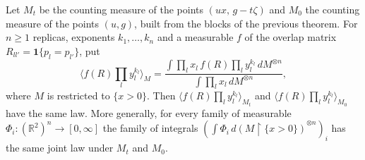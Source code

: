 \begin{theorem}\label{thm:sg:pd-lemma23}
  \leanok
Let $M_t$ be the counting measure of the points $(ux,\,g-t\zeta)$ and $M_0$ the counting measure of the points $(u,g)$, built from the blocks of the previous theorem. For $n\ge1$ replicas, exponents $k_1,\dots,k_n$ and a measurable $f$ of the overlap matrix $R_{ll'}=\mathbf 1\{p_l=p_{l'}\}$, put
\[\langle f(R)\textstyle\prod_l y_l^{k_l}\rangle_M=\frac{\int\prod_lx_l\,f(R)\prod_ly_l^{k_l}\,dM^{\otimes n}}{\int\prod_lx_l\,dM^{\otimes n}},\]
where $M$ is restricted to $\{x>0\}$. Then $\langle f(R)\prod_ly_l^{k_l}\rangle_{M_t}$ and $\langle f(R)\prod_l y_l^{k_l}\rangle_{M_0}$ have the same law. More generally, for every family of measurable $\Phi_i:(\mathbb R^2)^n\to[0,\infty]$ the family of integrals $(\int\Phi_i\,d(M\!\restriction\!\{x>0\})^{\otimes n})_i$ has the same joint law under $M_t$ and $M_0$.
\end{theorem}

